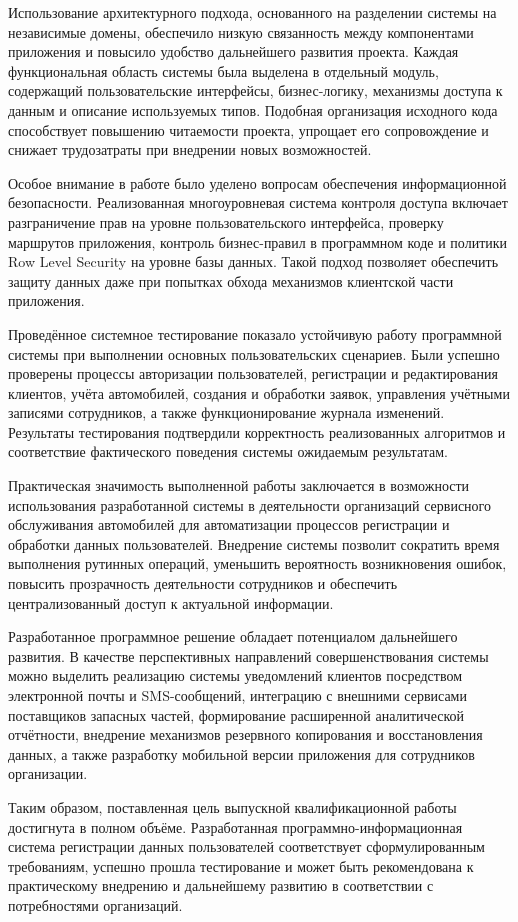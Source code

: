 Использование архитектурного подхода, основанного на разделении системы на независимые домены, обеспечило низкую связанность между компонентами приложения и повысило удобство дальнейшего развития проекта. Каждая функциональная область системы была выделена в отдельный модуль, содержащий пользовательские интерфейсы, бизнес-логику, механизмы доступа к данным и описание используемых типов. Подобная организация исходного кода способствует повышению читаемости проекта, упрощает его сопровождение и снижает трудозатраты при внедрении новых возможностей.

Особое внимание в работе было уделено вопросам обеспечения информационной безопасности. Реализованная многоуровневая система контроля доступа включает разграничение прав на уровне пользовательского интерфейса, проверку маршрутов приложения, контроль бизнес-правил в программном коде и политики Row Level Security на уровне базы данных. Такой подход позволяет обеспечить защиту данных даже при попытках обхода механизмов клиентской части приложения.

Проведённое системное тестирование показало устойчивую работу программной системы при выполнении основных пользовательских сценариев. Были успешно проверены процессы авторизации пользователей, регистрации и редактирования клиентов, учёта автомобилей, создания и обработки заявок, управления учётными записями сотрудников, а также функционирование журнала изменений. Результаты тестирования подтвердили корректность реализованных алгоритмов и соответствие фактического поведения системы ожидаемым результатам.

Практическая значимость выполненной работы заключается в возможности использования разработанной системы в деятельности организаций сервисного обслуживания автомобилей для автоматизации процессов регистрации и обработки данных пользователей. Внедрение системы позволит сократить время выполнения рутинных операций, уменьшить вероятность возникновения ошибок, повысить прозрачность деятельности сотрудников и обеспечить централизованный доступ к актуальной информации.

Разработанное программное решение обладает потенциалом дальнейшего развития. В качестве перспективных направлений совершенствования системы можно выделить реализацию системы уведомлений клиентов посредством электронной почты и SMS-сообщений, интеграцию с внешними сервисами поставщиков запасных частей, формирование расширенной аналитической отчётности, внедрение механизмов резервного копирования и восстановления данных, а также разработку мобильной версии приложения для сотрудников организации.

Таким образом, поставленная цель выпускной квалификационной работы достигнута в полном объёме. Разработанная программно-информационная система регистрации данных пользователей соответствует сформулированным требованиям, успешно прошла тестирование и может быть рекомендована к практическому внедрению и дальнейшему развитию в соответствии с потребностями организаций.